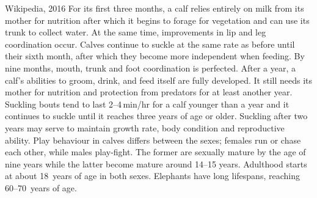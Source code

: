 \begin{exercise}
\begin{quoted}{Wikipedia, 2016}
For its first three months, a calf relies entirely on milk from its mother for nutrition after which it begins to forage for vegetation and can use its trunk to collect water.  At the same time, improvements in lip and leg coordination occur.  Calves continue to suckle at the same rate as before until their sixth month, after which they become more independent when feeding.  By nine months, mouth, trunk and foot coordination is perfected.  After a year, a calf's abilities to groom, drink, and feed itself are fully developed.  It still needs its mother for nutrition and protection from predators for at least another year.  Suckling bouts tend to last 2--4\,min/hr for a calf younger than a year and it continues to suckle until it reaches three years of age or older.  Suckling after two years may serve to maintain growth rate, body condition and reproductive ability.  Play behaviour in calves differs between the sexes; females run or chase each other, while males play-fight. The former are sexually mature by the age of nine years while the latter become mature around 14--15 years.  Adulthood starts at about 18~years of age in both sexes.  Elephants have long lifespans, reaching 60--70~years of age.
\end{quoted}
\end{exercise}






